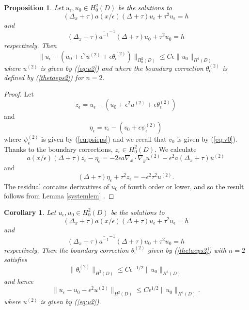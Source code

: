 \documentclass[10pt,a4paper]{amsart}
\newtheorem{proposition}{Proposition}
\newtheorem{corollary}{Corollary}
\begin{document}
\begin{proposition}\label{h2est} Let $u_\epsilon, u_0 \in H^2_0( D)$  be the solutions to 
\begin{equation} \label{fourthordeqest}  (\Delta_x +\tau) a(x/\epsilon) (\Delta +\tau) u_\epsilon +\tau^2 u_\epsilon= h \end{equation}
and
\begin{equation} \label{homogeqest}  (\Delta_x +\tau) \overline{a^{-1}}^{-1} (\Delta +\tau) u_0 +\tau^2 u_0= h \end{equation}
respectively. Then 
$$ \| u_\epsilon -(u_0 +\epsilon^2 u^{(2)}  +\epsilon \theta_\epsilon^{(2)}) \|_{H_0^2( D)} \leq C\epsilon \| u_0 \|_{H^4( D)} $$
where $u^{(2)}$ is given by (\ref{eq:u2}) and where the boundary correction $\theta^{(2)}_\epsilon$ is defined by (\ref{thetaeps2}) for $n=2$. 
\end{proposition} 
\begin{proof} Let 
$$ z_\epsilon =  u_\epsilon -(u_0 +\epsilon^2 u^{(2)}  +\epsilon\theta_\epsilon^{(2)} ) $$
and $$ \eta_\epsilon = v_\epsilon -(v_0 + \epsilon  \psi_\epsilon^{(2)}  )$$
where $\psi_\epsilon^{(2)}$ is given by (\ref{eq:psieps}) and we recall that $v_0$ is given by (\ref{eq:v0}).  Thanks to the boundary corrections, $z_\epsilon\in H^2_0( D)$. We calculate 
\begin{equation} a(x/\epsilon) (\Delta +\tau )z_\epsilon - \eta_\epsilon  = -2\epsilon  a \nabla_x\cdot\nabla_y u^{(2)} - \epsilon^2 a(\Delta_x+\tau)u^{(2)}  \label{useforeta1} \end{equation}
and
\begin{equation} (\Delta +\tau )\eta_\epsilon  +\tau^2 z_\epsilon = -\epsilon^2 \tau^2 u^{(2)} .\label{useforeta2} \end{equation}
The residual contains derivatives of $u_0$ of fourth order or lower, and so the result follows from Lemma \ref{systemlem} . 
\end{proof}
\noindent
\begin{corollary} \label{h2cor} Let $u_\epsilon, u_0 \in H^2_0( D)$  be the solutions to 
\begin{equation} \label{fourthordeqest2}  (\Delta_x +\tau) a(x/\epsilon) (\Delta +\tau) u_\epsilon +\tau^2 u_\epsilon= h \end{equation}
and
\begin{equation} \label{homogeqest2}  (\Delta_x +\tau) \overline{a^{-1}}^{-1} (\Delta +\tau) u_0 +\tau^2 u_0= h \end{equation}
respectively. Then the boundary correction $\theta_\epsilon^{(2)}$  given by (\ref{thetaeps2}) with $n=2$ satisfies 
$$\| \theta_\epsilon^{(2)}\|_{H^2( D)}\leq C\epsilon^{-1/2}\| u_0\|_{H^4( D)}$$
and hence 
$$ \| u_\epsilon - u_0 -\epsilon^2 u^{(2)}\|_{H^2( D)} \leq C\epsilon^{1/2} \| u_0 \|_{H^4( D)} .$$
where $u^{(2)}$ is given by (\ref{eq:u2}). 
\end{corollary} 
\end{document}
